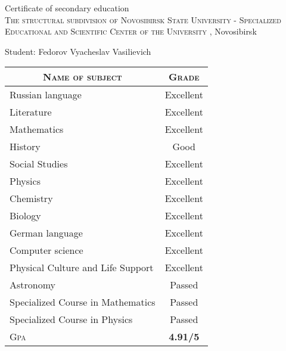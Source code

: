 \documentclass[a4paper,12pt]{article}
\begin{document}
\newpage
\par{\centering\Large \hypertarget{school}{Certificate of secondary education \\\textsc{The structural subdivision of Novosibirsk State University - Specialized Educational and Scientific Center of the University }, Novosibirsk}\par}
\large{\centering Student: Fedorov Vyacheslav Vasilievich\par}\normalsize 
\begin{center}
\begin{tabular}{lc}
\multicolumn{1}{c}{\textsc{Name of subject}}&\textsc{Grade}\\ \hline
Russian language    &Excellent\\
Literature    &Excellent\\
Mathematics    &Excellent\\
History     &Good\\
Social Studies    &Excellent\\
Physics    &Excellent\\
Chemistry    &Excellent\\
Biology    &Excellent\\
German language    &Excellent\\
Computer science    &Excellent\\
Physical Culture and Life Support    &Excellent\\
Astronomy   &Passed\\
Specialized Course in Mathematics   &Passed\\
Specialized Course in Physics       &Passed\\
\cline{1-2}
\textsc{Gpa}&\textbf{4.91/5}
\end{tabular}
\end{center}


\end{document}
